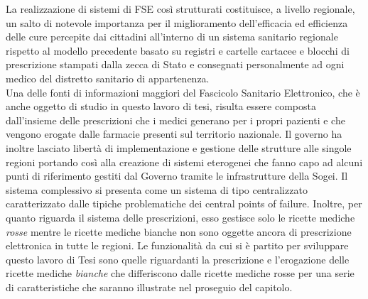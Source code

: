 La realizzazione di sistemi di FSE così strutturati costituisce, a livello regionale, un salto di notevole importanza per il miglioramento dell’efficacia ed efficienza delle cure percepite dai cittadini all’interno di un sistema sanitario regionale rispetto al modello precedente basato su registri e cartelle cartacee e blocchi di prescrizione stampati dalla zecca di Stato e consegnati personalmente ad ogni medico del distretto sanitario di appartenenza. \\
Una delle fonti di informazioni maggiori del Fascicolo Sanitario Elettronico, che è anche oggetto di studio in questo lavoro di tesi, risulta essere composta dall'insieme delle prescrizioni che i medici generano per i propri pazienti e che vengono erogate dalle farmacie presenti sul territorio nazionale. Il governo ha inoltre lasciato libertà di implementazione e gestione delle strutture alle singole regioni portando così alla creazione di sistemi eterogenei che fanno capo ad alcuni punti di riferimento gestiti dal Governo tramite le infrastrutture della Sogei. Il sistema complessivo si presenta come un sistema di tipo centralizzato caratterizzato dalle tipiche problematiche dei central points of failure. Inoltre, per quanto riguarda il sistema delle prescrizioni, esso gestisce solo le ricette mediche \emph{rosse} mentre le ricette mediche bianche non sono oggette ancora di prescrizione elettronica in tutte le regioni. Le funzionalità da cui si è partito per sviluppare questo lavoro di Tesi sono quelle riguardanti la prescrizione e l'erogazione delle ricette mediche \emph{bianche} che differiscono dalle ricette mediche rosse per una serie di caratteristiche che saranno illustrate nel proseguio del capitolo.
%
